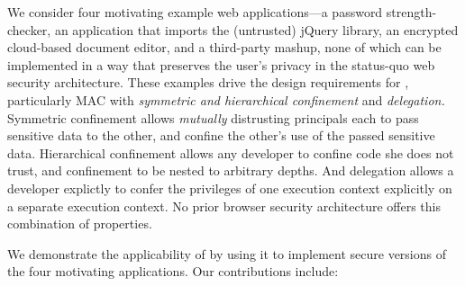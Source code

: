 We consider four motivating example web ap\-pli\-ca\-tions---a
password strength-checker, an application that imports the (untrusted)
jQuery library, an encrypted cloud-based document editor, and a
third-party mashup, none of which can be implemented in a way that
preserves the user's privacy in the status-quo web security
architecture. These examples drive the design requirements for \sys{},
particularly MAC with {\em symmetric and hierarchical confinement} and
{\em delegation.}  Symmetric confinement allows {\em mutually}
distrusting principals each to pass sensitive data to the other, and
confine the other's use of the passed sensitive data. Hierarchical
confinement allows any developer to confine code she does not trust,
and confinement to be nested to arbitrary depths. And delegation
allows a developer explictly to confer the privileges of one execution
context explicitly on a separate execution context.
%
No prior browser security architecture offers this combination of
properties.


We demonstrate the applicability of \sys{} by using it to implement
secure versions of the four motivating applications.
Our contributions include:

